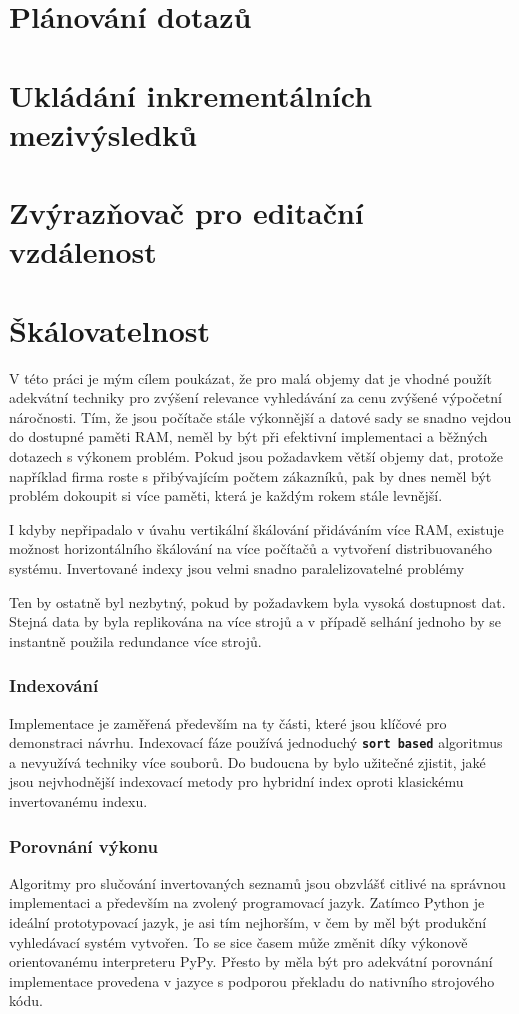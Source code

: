 \documentclass[11pt,letterpaper,oneside,openright]{book}
\newcommand{\bftt}[1]{\texttt{\textbf{#1}}}
\begin{document}
\section{Plánování dotazů}
\section{Ukládání inkrementálních mezivýsledků}
\section{Zvýrazňovač pro editační vzdálenost}
\section{Škálovatelnost}
V této práci je mým cílem poukázat, že pro malá objemy dat je vhodné použít
adekvátní techniky pro zvýšení relevance vyhledávání za cenu zvýšené výpočetní
náročnosti. Tím, že jsou počítače stále výkonnější a datové sady se snadno
vejdou do dostupné paměti RAM, neměl by být při efektivní implementaci a
běžných dotazech s výkonem problém. Pokud jsou požadavkem větší objemy dat,
protože například firma roste s přibývajícím počtem zákazníků, pak by dnes
neměl být problém dokoupit si více paměti, která je každým rokem stále levnější.

I kdyby nepřipadalo v úvahu vertikální škálování přidáváním více RAM, existuje
možnost horizontálního škálování na více počítačů a vytvoření distribuovaného
systému. Invertované indexy jsou velmi snadno paralelizovatelné problémy

Ten by ostatně byl nezbytný, pokud by požadavkem byla vysoká
dostupnost dat. Stejná data by byla replikována na více strojů a v případě
selhání jednoho by se instantně použila redundance více strojů.



\subsubsection{Indexování}
Implementace je zaměřená především na ty části, které jsou klíčové pro
demonstraci návrhu. Indexovací fáze používá jednoduchý \bftt{sort based}
algoritmus a nevyužívá techniky více souborů. Do budoucna by bylo užitečné
zjistit, jaké jsou nejvhodnější indexovací metody pro hybridní index oproti
klasickému invertovanému indexu.

\subsubsection{Porovnání výkonu}
Algoritmy pro slučování invertovaných seznamů jsou obzvlášť citlivé na správnou
implementaci a především na zvolený programovací jazyk. Zatímco Python je
ideální prototypovací jazyk, je asi tím nejhorším, v čem by měl být produkční
vyhledávací systém vytvořen. To se sice časem může změnit díky výkonově
orientovanému interpreteru PyPy. Přesto by měla být pro adekvátní porovnání
implementace provedena v jazyce s podporou překladu do nativního strojového
kódu.
\end{document}
